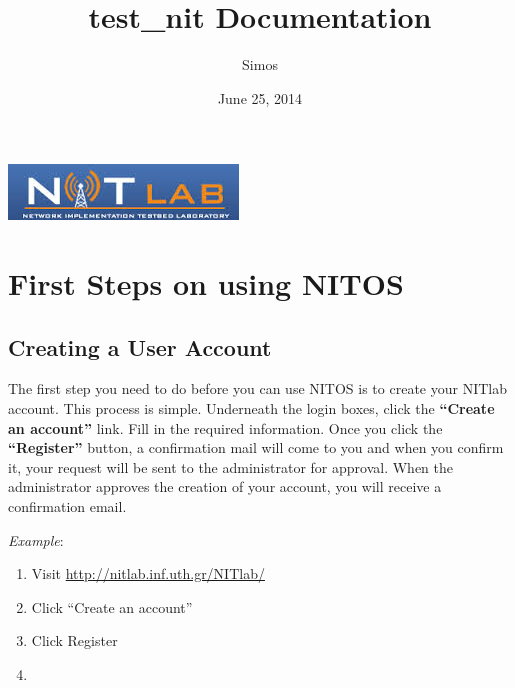 \documentclass[letterpaper,10pt,english]{sphinxmanual}
\title{test\_nit Documentation}
\date{June 25, 2014}
\author{Simos}
\begin{document}
\maketitle
\tableofcontents
{}\label{index::doc}
{\hfill\includegraphics{nitlab_logo.jpeg}\hfill}




\chapter{First Steps on using NITOS}
\label{index:nitlab-documentation}\label{index:first-steps-on-using-nitos}

\section{Creating a User Account}
\label{account_create:creating-a-user-account}\label{account_create::doc}
The first step you need to do before you can use NITOS is to create your NITlab account. This process is simple. Underneath the login boxes, click the \textbf{“Create an account”} link. Fill in the required information. Once you click the \textbf{“Register”} button, a confirmation mail will come to you and when you confirm it, your request will be sent to the administrator for approval. When the administrator approves the creation of your account, you will receive a confirmation email.

\emph{Example}:
\begin{enumerate}
\item {} 
Visit \href{http://nitlab.inf.uth.gr/NITlab/}{http://nitlab.inf.uth.gr/NITlab/}

\item {} 
Click ``Create an account''

\item {} 

Click Register

\item {} 

\end{enumerate}
\end{document}
